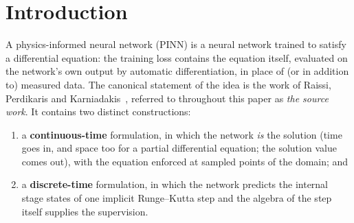 \documentclass[11pt,a4paper]{article}
\begin{document}
\begin{abstract}
discrete-time formulation, generalised so that the network input is the
starting state itself, learns a single reusable implicit Runge--Kutta step
of size $\Delta t = 0.8$ from the equations alone. Swept over the number
of stages against the exactly solved scheme, it is scheme-limited at $q=2$
and network-limited from $q=4$, with an endpoint error floor of
$3.6\times10^{-3}$ that a 135-run architecture sweep shows to be an
optimisation floor rather than a capacity one (rank correlation between
training loss and held-out one-step error $+0.974$). Long-horizon quality
is decided by the training seed, is measurable on a validation chain, and
transfers. A simple selection protocol (train ten seeds, chain each to the
target horizon on validation starts, keep the best) yields a single
network of 4 layers and 32 units that carries 108 held-out starting
states through six periods at $2.0\times10^{-3}$ relative $L_2$ error, a
horizon at which even the causally weighted continuous-time formulation
has an error above one, and that stays flat to thirty periods on fresh
starts. Chaining this map beats the source work's single-large-step mode
by a factor of 10 at the largest feasible step. Finally, a matched
data-supervised twin quantifies the accuracy cost of training from the
equations alone: the equation-trained network lands within a factor 2.1
of perfect-label training at zero reference-data cost.
\end{abstract}

\tableofcontents

\section{Introduction}
\label{sec:intro}

A physics-informed neural network (PINN) is a neural network trained to
satisfy a differential equation: the training loss contains the equation
itself, evaluated on the network's own output by automatic differentiation,
in place of (or in addition to) measured data. The canonical statement of
the idea is the work of Raissi, Perdikaris and
Karniadakis~\cite{raissi2019}, referred to throughout this paper as
\emph{the source work}. It contains two distinct constructions:

\begin{enumerate}
  \item a \textbf{continuous-time} formulation, in which the network
  \emph{is} the solution (time goes in, and space too for a partial
  differential equation; the solution value comes out), with the equation
  enforced at sampled points of the domain; and
  \item a \textbf{discrete-time} formulation, in which the network predicts
  the internal stage states of one implicit Runge--Kutta step and the
  algebra of the step itself supplies the supervision.
\end{enumerate}
\end{document}
